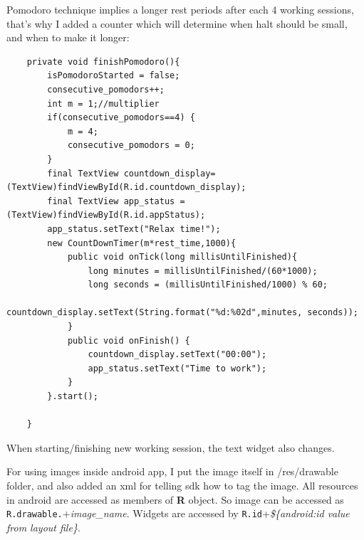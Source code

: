 Pomodoro technique implies a longer rest periods after each 4 working sessions, that's why I
added a counter which will determine when halt should be small, and when to make it longer:
\begin{verbatim}
    private void finishPomodoro(){
        isPomodoroStarted = false;
        consecutive_pomodors++;
        int m = 1;//multiplier
        if(consecutive_pomodors==4) {
            m = 4;
            consecutive_pomodors = 0;
        }
        final TextView countdown_display= (TextView)findViewById(R.id.countdown_display);
        final TextView app_status = (TextView)findViewById(R.id.appStatus);
        app_status.setText("Relax time!");
        new CountDownTimer(m*rest_time,1000){
            public void onTick(long millisUntilFinished){
                long minutes = millisUntilFinished/(60*1000);
                long seconds = (millisUntilFinished/1000) % 60;
                countdown_display.setText(String.format("%d:%02d",minutes, seconds));
            }
            public void onFinish() {
                countdown_display.setText("00:00");
                app_status.setText("Time to work");
            }
        }.start();

    }
\end{verbatim}
When starting/finishing new working session, the text widget also changes.

For using images inside android app, I put the image itself in /res/drawable folder, and
also added an xml for telling sdk how to tag the image. All resources in android are 
accessed as members of \textbf{R} object. So image can be accessed as \texttt{R.drawable.}+\emph{image\_name}.
Widgets are accessed by \texttt{R.id}+\emph{\$\{android:id value from layout file\}}. 
